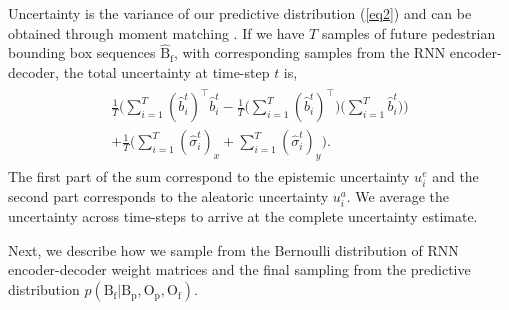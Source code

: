 Uncertainty is the variance of our predictive distribution (\ref{eq2}) and can be obtained through moment matching \cite{gal2016dropout,kendall2017uncertainties}. If we have $T$ samples of future pedestrian bounding box sequences $\hat{\text{B}}_{\text{f}}$, with corresponding samples from the RNN encoder-decoder, the total uncertainty at time-step $t$ is,  
\begin{align}\label{eq6}
\begin{split}
\frac{1}{T} \Big( \sum_{i=1}^{T} (\hat{b}^{t}_{i})^\intercal \hat{b}^{t}_{i} - \frac{1}{T} \big( \sum_{i=1}^{T} (\hat{b}^{t}_{i})^\intercal \big) \big( \sum_{i=1}^{T} \hat{b}^{t}_{i} \big) \Big) \\+ \frac{1}{T} \Big( \sum_{i=1}^{T} (\hat{\sigma}_{i}^{t})_{x} +\sum_{i=1}^{T} (\hat{\sigma}_{i}^{t})_{y} \Big).
\end{split}
\end{align}
The first part of the sum correspond to the epistemic uncertainty $u_{i}^{e}$ and the second part corresponds to the aleatoric uncertainty $u_{i}^{a}$. We average the uncertainty across time-steps to arrive at the complete uncertainty estimate.
\iffalse
The predictive distribution can be evaluated by measuring the probability assigned to the true $y^{*}$ (true $\text{B}_{\text{future}}$) using the negative log-likelihood ($\operatorname{\mathcal{L}}$) metric \cite{gal2016dropout},
\begin{align}
\operatorname{\mathcal{L}}(y^{*}) = -\log(\frac{1}{T}\sum_{i=1}^{T} p(y^{*} | x^{*}, \hat{\omega}_{i} )),\; \hat{\omega}_{i} \sim q(\omega).
\end{align}
\fi
Next, we describe how we sample from the Bernoulli distribution of RNN encoder-decoder weight matrices and the final sampling from the predictive distribution $p(\text{B}_{\text{f}} | \text{B}_{\text{p}}, \text{O}_{\text{p}}, \text{O}_{\text{f}} )$.

